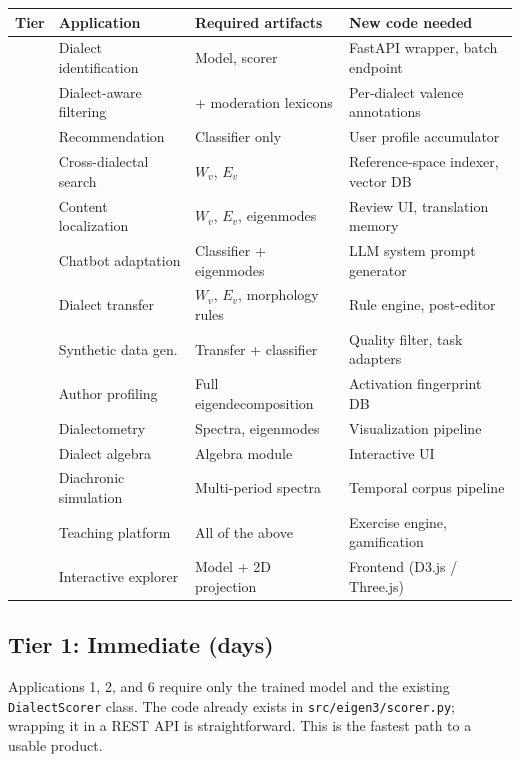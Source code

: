 \documentclass[11pt,a4paper]{article}
\begin{document}
\begin{center}
\renewcommand{\arraystretch}{1.3}
\begin{tabular}{>{\small}c >{\small}l >{\small}p{3.5cm} >{\small}p{5cm}}
\toprule
\textbf{Tier} & \textbf{Application} & \textbf{Required artifacts}
& \textbf{New code needed} \\
\midrule
\multirow{3}{*}{1}
  & Dialect identification & Model, scorer &
    FastAPI wrapper, batch endpoint \\
  & Dialect-aware filtering & + moderation lexicons &
    Per-dialect valence annotations \\
  & Recommendation & Classifier only &
    User profile accumulator \\
\midrule
\multirow{3}{*}{2}
  & Cross-dialectal search & $W_v$, $E_v$ &
    Reference-space indexer, vector DB \\
  & Content localization & $W_v$, $E_v$, eigenmodes &
    Review UI, translation memory \\
  & Chatbot adaptation & Classifier + eigenmodes &
    LLM system prompt generator \\
\midrule
\multirow{3}{*}{3}
  & Dialect transfer & $W_v$, $E_v$, morphology rules &
    Rule engine, post-editor \\
  & Synthetic data gen. & Transfer + classifier &
    Quality filter, task adapters \\
  & Author profiling & Full eigendecomposition &
    Activation fingerprint DB \\
\midrule
\multirow{4}{*}{4}
  & Dialectometry & Spectra, eigenmodes &
    Visualization pipeline \\
  & Dialect algebra & Algebra module &
    Interactive UI \\
  & Diachronic simulation & Multi-period spectra &
    Temporal corpus pipeline \\
  & Teaching platform & All of the above &
    Exercise engine, gamification \\
  & Interactive explorer & Model + 2D projection &
    Frontend (D3.js / Three.js) \\
\bottomrule
\end{tabular}
\end{center}

\subsection{Tier 1: Immediate (days)}

Applications 1, 2, and 6 require only the trained model and the
existing \texttt{DialectScorer} class. The code already exists in
\texttt{src/eigen3/scorer.py}; wrapping it in a REST API is
straightforward. This is the fastest path to a usable product.
\end{document}
